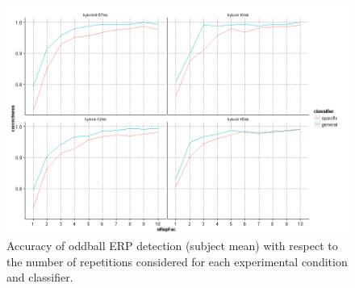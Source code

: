 %
\begin{figure}[t]
\centering
\includegraphics[width=\textwidth]{pix/P3AccuracyPerClassifierPerFreq}
\caption{
Accuracy of oddball ERP detection (subject mean) with respect to the number of repetitions considered for each experimental condition and classifier.
}
\label{fig:P3AccPerClassifier}
\end{figure}

